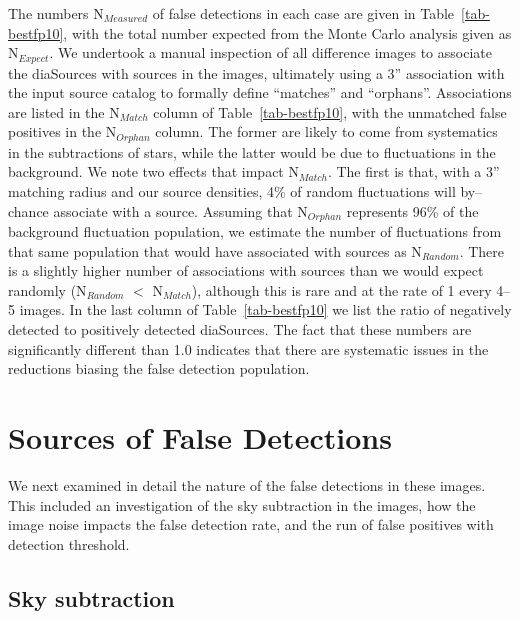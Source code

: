 \documentclass[floatfix, apj]{emulateapj}
\begin{document}
The numbers N$_{Measured}$ of false detections in each case are given in Table~\ref{tab-bestfp10}, with the total number expected from the Monte Carlo analysis given as N$_{Expect}$.
We undertook a manual inspection of all difference images to associate the diaSources with sources in the images, ultimately using a 3'' association with the input source catalog to formally define ``matches'' and ``orphans''.
Associations are listed in the N$_{Match}$ column of Table~\ref{tab-bestfp10}, with the unmatched false positives in the N$_{Orphan}$ column.
The former are likely to come from systematics in the subtractions of stars, while the latter would be due to fluctuations in the background.
We note two effects that impact N$_{Match}$.
The first is that, with a 3'' matching radius and our source densities, 4\% of random fluctuations will by--chance associate with a source.
Assuming that N$_{Orphan}$ represents 96\% of the background fluctuation population, we estimate the number of fluctuations from that same population that would have associated with sources as N$_{Random}$.
There is a slightly higher number of associations with sources than we would expect randomly (N$_{Random}$ $<$ N$_{Match}$), although this is rare and at the rate of 1 every 4--5 images.
In the last column of Table~\ref{tab-bestfp10} we list the ratio of negatively detected to positively detected diaSources.
The fact that these numbers are significantly different than 1.0 indicates that there are systematic issues in the reductions biasing the false detection population.

\section{Sources of False Detections}
We next examined in detail the nature of the false detections in these images.
This included an investigation of the sky subtraction in the images, how the image noise impacts the false detection rate, and the run of false positives with detection threshold.

\subsection{Sky subtraction}
\end{document}
